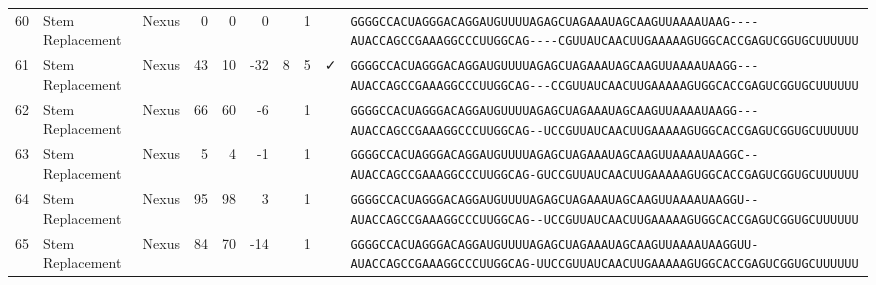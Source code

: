 \begin{tabular}{rllrrrrrcl}
 60 & Stem Replacement & Nexus & 0 & 0 & 0 &  & 1 &  &
 \color{ucsfblack}\verb|GGGGCCACUAGGGACAGGAU|\color{ucsfblue}\verb|GUUUUAGAGCUAGAAAUAGCAAGUUAAAAU|\color{ucsfnavy}\verb|AAG----|\color{ucsfpurple}\verb|AUACCAGCCGAAAGGCCCUUGGCAG|\color{ucsfnavy}\verb|----CGU|\color{ucsfteal}\verb|UAUCAACUUGAAAAAGUGGCACCGAGUCGGUGC|\color{ucsfblack}\verb|UUUUUU| \\

 61 & Stem Replacement & Nexus & 43 & 10 & -32 & 8 & 5 & ✓ &
 \color{ucsfblack}\verb|GGGGCCACUAGGGACAGGAU|\color{ucsfblue}\verb|GUUUUAGAGCUAGAAAUAGCAAGUUAAAAU|\color{ucsfnavy}\verb|AAGG---|\color{ucsfpurple}\verb|AUACCAGCCGAAAGGCCCUUGGCAG|\color{ucsfnavy}\verb|---CCGU|\color{ucsfteal}\verb|UAUCAACUUGAAAAAGUGGCACCGAGUCGGUGC|\color{ucsfblack}\verb|UUUUUU| \\

 62 & Stem Replacement & Nexus & 66 & 60 & -6 &  & 1 &  &
 \color{ucsfblack}\verb|GGGGCCACUAGGGACAGGAU|\color{ucsfblue}\verb|GUUUUAGAGCUAGAAAUAGCAAGUUAAAAU|\color{ucsfnavy}\verb|AAGG---|\color{ucsfpurple}\verb|AUACCAGCCGAAAGGCCCUUGGCAG|\color{ucsfnavy}\verb|--UCCGU|\color{ucsfteal}\verb|UAUCAACUUGAAAAAGUGGCACCGAGUCGGUGC|\color{ucsfblack}\verb|UUUUUU| \\

 63 & Stem Replacement & Nexus & 5 & 4 & -1 &  & 1 &  &
 \color{ucsfblack}\verb|GGGGCCACUAGGGACAGGAU|\color{ucsfblue}\verb|GUUUUAGAGCUAGAAAUAGCAAGUUAAAAU|\color{ucsfnavy}\verb|AAGGC--|\color{ucsfpurple}\verb|AUACCAGCCGAAAGGCCCUUGGCAG|\color{ucsfnavy}\verb|-GUCCGU|\color{ucsfteal}\verb|UAUCAACUUGAAAAAGUGGCACCGAGUCGGUGC|\color{ucsfblack}\verb|UUUUUU| \\

 64 & Stem Replacement & Nexus & 95 & 98 & 3 &  & 1 &  &
 \color{ucsfblack}\verb|GGGGCCACUAGGGACAGGAU|\color{ucsfblue}\verb|GUUUUAGAGCUAGAAAUAGCAAGUUAAAAU|\color{ucsfnavy}\verb|AAGGU--|\color{ucsfpurple}\verb|AUACCAGCCGAAAGGCCCUUGGCAG|\color{ucsfnavy}\verb|--UCCGU|\color{ucsfteal}\verb|UAUCAACUUGAAAAAGUGGCACCGAGUCGGUGC|\color{ucsfblack}\verb|UUUUUU| \\

 65 & Stem Replacement & Nexus & 84 & 70 & -14 &  & 1 &  &
 \color{ucsfblack}\verb|GGGGCCACUAGGGACAGGAU|\color{ucsfblue}\verb|GUUUUAGAGCUAGAAAUAGCAAGUUAAAAU|\color{ucsfnavy}\verb|AAGGUU-|\color{ucsfpurple}\verb|AUACCAGCCGAAAGGCCCUUGGCAG|\color{ucsfnavy}\verb|-UUCCGU|\color{ucsfteal}\verb|UAUCAACUUGAAAAAGUGGCACCGAGUCGGUGC|\color{ucsfblack}\verb|UUUUUU| \\


\end{tabular}
